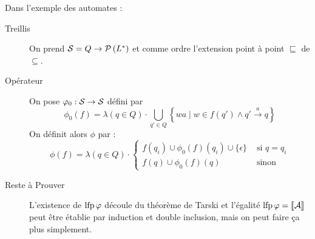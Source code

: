 \documentclass{cours}
\begin{document}
Dans l'exemple des automates :
\begin{description}
	\item[Treillis] On prend $\mathcal{S} = Q \to \mathcal{P}\left(L^{*}\right)$ et comme ordre l'extension point à point $\sqsubseteq$ de $\subseteq$.
	\item[Opérateur] On pose $\varphi_{0}: \mathcal{S} \to \mathcal{S}$ défini par
	      \[
		      \phi_{0}(f) = \lambda(q \in Q) \cdot \bigcup_{q' \in Q}\left\{wa \mid w \in f(q') \land q' \xrightarrow{a} q\right\}
	      \]
	      On définit alors $\phi$ par :
	      \[
		      \phi(f) = \lambda(q \in Q) \cdot \begin{cases}
			      f(q_{i}) \cup \phi_{0}(f)(q_{i}) \cup \{\epsilon\} & \text{ si } q = q_{i} \\
			      f(q) \cup \phi_{0}(f)(q)                           & \text{ sinon}
		      \end{cases}
	      \]
	\item[Reste à Prouver] L'existence de $\operatorname{lfp}\varphi$ découle du théorème de Tarski et l'égalité $\operatorname{lfp} \varphi = \left\llbracket \mathcal{A} \right\rrbracket$ peut être établie par induction et double inclusion, mais on peut faire ça plus simplement.
\end{description}
\end{document}
